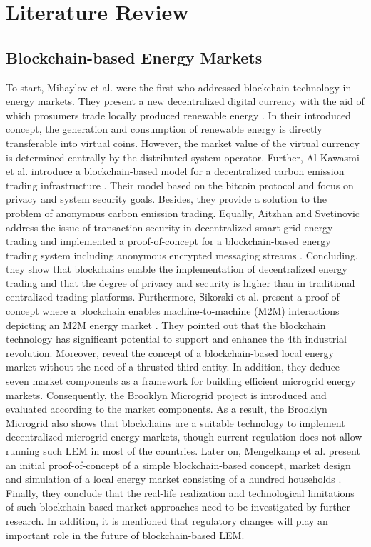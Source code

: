 \section{Literature Review}
\label{sec:literature_review}

\subsection{Blockchain-based Energy Markets}
\label{sec:Blockchain-based Energy Markets}
To start, Mihaylov et al. were the first who addressed blockchain technology in
energy markets. They present a new decentralized digital currency with the aid of
which prosumers trade locally produced renewable energy .
In their introduced concept, the generation and consumption of renewable energy is directly
transferable into virtual coins. However, the market value of the virtual currency is determined
centrally by the distributed system operator. Further, Al Kawasmi et al. introduce a blockchain-based
model for a decentralized carbon emission trading infrastructure .
Their model based on the bitcoin protocol and focus on privacy and system security goals.
Besides, they provide a solution to the problem of anonymous carbon emission trading.
Equally, Aitzhan and Svetinovic address the issue of transaction security in
decentralized smart grid energy trading and implemented a proof-of-concept for a
blockchain-based energy trading system including anonymous encrypted messaging streams .
Concluding, they show that blockchains enable the implementation of decentralized energy trading and that the degree
of privacy and security is higher than in traditional centralized trading platforms. Furthermore, Sikorski et al.
present a proof-of-concept where a blockchain enables machine-to-machine (M2M) interactions depicting an
M2M energy market . They pointed out that the blockchain technology has
significant potential to support and enhance the 4th industrial revolution. Moreover, 
reveal the concept of a blockchain-based local energy market without the need of a thrusted
third entity. In addition, they deduce seven market
components as a framework for building efficient microgrid energy markets. Consequently,
the Brooklyn Microgrid project is introduced and evaluated according to the market components.
As a result, the Brooklyn Microgrid also shows that blockchains are a suitable technology
to implement decentralized microgrid energy markets, though current regulation does not
allow running such LEM in most of the countries. Later on, Mengelkamp et al.
present an initial proof-of-concept of a simple blockchain-based concept, market design and
simulation of a local energy market consisting of a hundred households .
Finally, they conclude that the real-life realization and technological limitations of such blockchain-based
market approaches need to be investigated by further research. In addition, it is mentioned that regulatory
changes will play an important role in the future of blockchain-based LEM.

